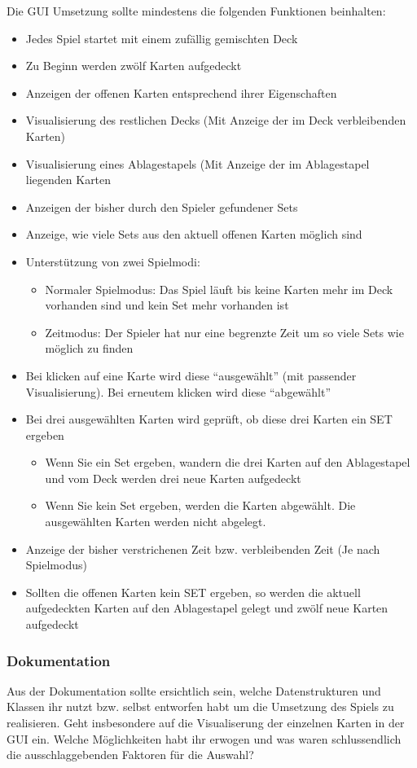 \documentclass[a4paper,
			   fontsize=12pt]{article}
\begin{document}
Die GUI Umsetzung sollte mindestens die folgenden Funktionen beinhalten:
\begin{itemize}
	\item Jedes Spiel startet mit einem zufällig gemischten Deck
	\item Zu Beginn werden zwölf Karten aufgedeckt
	\item Anzeigen der offenen Karten entsprechend ihrer Eigenschaften
	\item Visualisierung des restlichen Decks (Mit Anzeige der im Deck verbleibenden Karten)
	\item Visualisierung eines Ablagestapels (Mit Anzeige der im Ablagestapel liegenden Karten
	\item Anzeigen der bisher durch den Spieler gefundener Sets
	\item Anzeige, wie viele Sets aus den aktuell offenen Karten möglich sind
	\item Unterstützung von zwei Spielmodi:
	\begin{itemize}
		\item Normaler Spielmodus: Das Spiel läuft bis keine Karten mehr im Deck vorhanden sind und kein Set mehr vorhanden ist
		\item Zeitmodus: Der Spieler hat nur eine begrenzte Zeit um so viele Sets wie möglich zu finden
	\end{itemize}
	\item Bei klicken auf eine Karte wird diese "`ausgewählt"' (mit passender Visualisierung). Bei erneutem klicken wird diese "`abgewählt"'
	\item Bei drei ausgewählten Karten wird geprüft, ob diese drei Karten ein SET ergeben
	\begin{itemize}
		\item Wenn Sie ein Set ergeben, wandern die drei Karten auf den Ablagestapel und vom Deck werden drei neue Karten aufgedeckt
		\item Wenn Sie kein Set ergeben, werden die Karten abgewählt. Die ausgewählten Karten werden nicht abgelegt.
	\end{itemize}
	\item Anzeige der bisher verstrichenen Zeit bzw. verbleibenden Zeit (Je nach Spielmodus)
	\item Sollten die offenen Karten kein SET ergeben, so werden die aktuell aufgedeckten Karten auf den Ablagestapel gelegt und zwölf neue Karten aufgedeckt
\end{itemize}

\subsubsection*{Dokumentation}
Aus der Dokumentation sollte ersichtlich sein, welche Datenstrukturen und Klassen ihr nutzt bzw. selbst entworfen habt um die Umsetzung des Spiels zu realisieren.
Geht insbesondere auf die Visualiserung der einzelnen Karten in der GUI ein. Welche Möglichkeiten habt ihr erwogen und was waren schlussendlich die ausschlaggebenden
Faktoren für die Auswahl?
\end{document}
